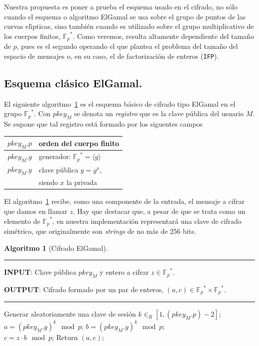 \documentclass{cedi}%
\def\ces{curvas{} el\'{\i}pticas}%
\newcommand{\Fp}{\ensuremath{\mathbb{F}_p}}%
\theoremstyle{plain}        			%
\theoremstyle{definition}   			%
\theoremstyle{saltolinea}   			%
\newtheorem{algo}{Algoritmo}
\begin{document}
Nuestra propuesta es poner a prueba el esquema usado en el cifrado, no s\'olo cuando el esquema o algoritmo ElGamal se usa sobre el grupo de puntos de las {\ces}, sino tambi\'en cuando es utilizado sobre el grupo multiplicativo de los cuerpos finitos, $\Fp^*$. Como veremos, resulta altamente dependiente del tama\~no de $p$, pues es el segundo operando el que plantea el problema del tama\~no del espacio de mensajes o, en su caso, el de factorizaci\'on de enteros (\texttt{IFP}).

\subsection{Esquema cl\'asico ElGamal.}

El siguiente algoritmo~\ref{alg:ElGamal} es el esquema b\'asico de cifrado tipo ElGamal en el grupo $\Fp^*$. Con $pkey_M$ se denota un \emph{registro} que es la clave p\'ublica del usuario $M$. Se supone que tal registro est\'a formado por los siguentes campos

\begin{center}\begin{tabular}{c|l}$pkey_M.p$ & \hspace{1mm} orden del cuerpo finito  \\ \hline $pkey_M.g$ & \hspace{1mm} generador: $\Fp^*=\langle g\rangle$\\ \hline $pkey_M.y$ & \hspace{1mm} clave p\'ublica $y=g^x$,\\[-.5mm] & \hspace{1mm} siendo $x$ la privada\end{tabular}\end{center}

El algoritmo~\ref{alg:ElGamal} recibe, como una componente de la entrada, el mensaje a cifrar que damos en llamar $z$. Hay que destacar que, a pesar de que se trata como un elemento de $\Fp^*$, en nuestra implementaci\'on representar\'a una clave de cifrado sim\'etrico, que originalmente son \emph{strings} de no m\'as de 256 bits.

\begin{algo}[Cifrado ElGamal]\label{alg:ElGamal}
\parbox[b]{\linewidth}{%
\hrule
\smallskip
{\bf INPUT}: Clave p\'ublica $pkey_{M}$ y entero a cifrar $z\in\Fp^*$.

{\bf OUTPUT}: Cifrado formado por un par de enteros, $(a,c)\in\Fp^*\times \Fp^*$.
\vspace{1.5mm}
\hrule
}%
\begin{algorithmic}[1]
\STATE Generar aleatoriamente una clave de sesi\'on $k\in_{R}\left[1,\left(pkey_{M}.p\right)-2\right]$;
\STATE $a=(pkey_{M}.g)^{k}\mod p$;
\STATE $b=(pkey_{M}.y)^{k}\mod p$; \\
\STATE $c=z\cdot b\mod p$;
\STATE Return $(a,c)$;
\end{algorithmic}
\end{algo}%
\end{document}
